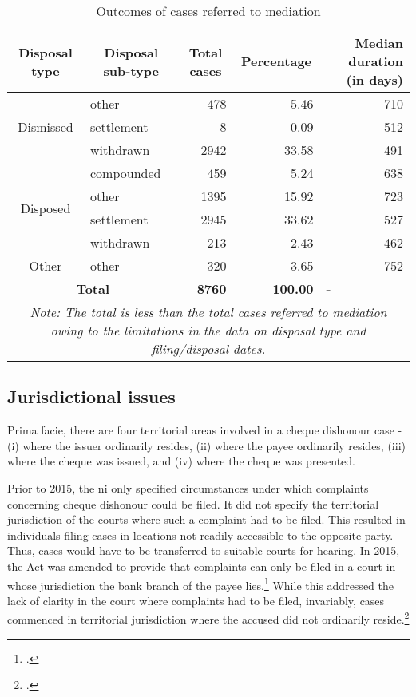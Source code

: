 {\footnotesize \begin{longtable}{@{}clrrr@{}}
\caption{Outcomes of cases referred to mediation}
\label{tab:mediation}\\
\toprule
 \textbf{Disposal type} & \multicolumn{1}{c}{\textbf{Disposal sub-type}} & \multicolumn{1}{c}{\textbf{Total cases}} & \multicolumn{1}{c}{\textbf{Percentage}} & \multicolumn{1}{p{3cm}}{\textbf{Median duration (in days)}} \\
 \midrule
\endhead
\multirow{3}{*}{Dismissed} & other & 478 & 5.46 & 710 \\
 & settlement & 8 & 0.09 & 512 \\
 & withdrawn & 2942 & 33.58 & 491 \\
 \midrule
\multirow{4}{*}{Disposed} & compounded & 459 & 5.24 & 638 \\
 & other & 1395 & 15.92 & 723 \\
 & settlement & 2945 & 33.62 & 527 \\
 & withdrawn & 213 & 2.43 & 462 \\
 \midrule
 Other & other & 320 & 3.65 & 752 \\
 \midrule
 \multicolumn{2}{c}{\textbf{Total}} & \textbf{8760} & \textbf{100.00} & \multicolumn{1}{l}{\textbf{-}} \\
 \bottomrule
 \multicolumn{5}{p{11cm}}{{\footnotesize \emph{Note: The total is less than the total cases referred to mediation owing to the limitations in the data on disposal type and filing/disposal dates.}}}
\end{longtable}}

\subsection{Jurisdictional issues}

Prima facie, there are four territorial areas involved in a cheque dishonour case - (i) where the issuer ordinarily resides, (ii) where the payee ordinarily resides, (iii) where the cheque was issued, and (iv) where the cheque was presented. 

Prior to 2015, the \gls{ni} only specified circumstances under which complaints concerning cheque dishonour could be filed. It did not specify the territorial jurisdiction of the courts where such a complaint had to be filed. This resulted in individuals filing cases in locations not readily accessible to the opposite party. Thus, cases would have to be transferred to suitable courts for hearing. In 2015, the Act was amended to provide that complaints can only be filed in a court in whose jurisdiction the bank branch of the payee lies.\footcite{niAmend2015} While this addressed the lack of clarity in the court where complaints had to be filed, invariably, cases commenced in territorial jurisdiction where the accused did not ordinarily reside.\footcite{amicus2020_submission}

